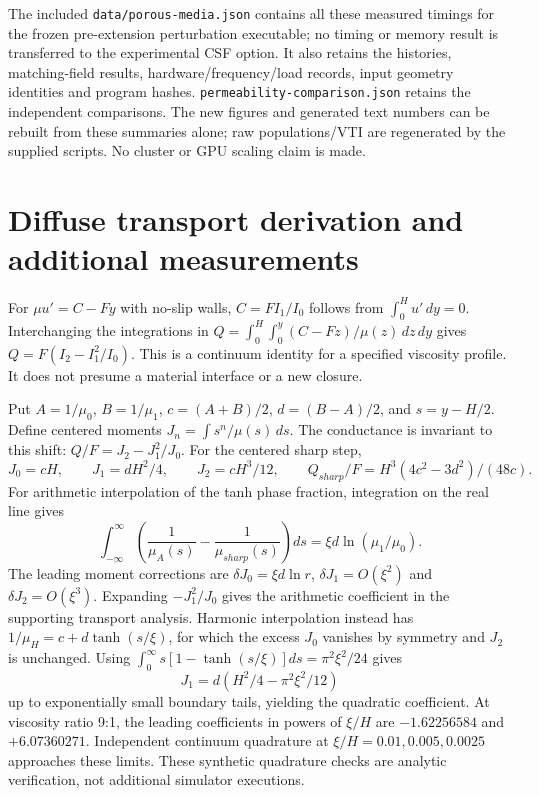 \documentclass[11pt]{article}
\begin{document}


The included \texttt{data/porous-media.json} contains all these measured
timings for the frozen pre-extension perturbation executable; no timing or
memory result is transferred to the experimental CSF option.
It also retains the
histories, matching-field results, hardware/frequency/load records, input
geometry identities and program hashes. \texttt{permeability-comparison.json}
retains the independent comparisons. The new figures and generated text
numbers can be rebuilt from these summaries alone; raw populations/VTI are
regenerated by the supplied scripts. No cluster or GPU scaling claim is made.

\section{Diffuse transport derivation and additional measurements}
For $\mu u'=C-Fy$ with no-slip walls, $C=FI_1/I_0$ follows from
$\int_0^H u'\,dy=0$. Interchanging the integrations in
$Q=\int_0^H\int_0^y(C-Fz)/\mu(z)\,dz\,dy$ gives
$Q=F(I_2-I_1^2/I_0)$. This is a continuum identity for a specified viscosity
profile. It does not presume a material interface or a new closure.

Put $A=1/\mu_0$, $B=1/\mu_1$, $c=(A+B)/2$, $d=(B-A)/2$,
and $s=y-H/2$. Define centered moments $J_n=\int s^n/\mu(s)\,ds$.
The conductance is invariant to this shift:
$Q/F=J_2-J_1^2/J_0$. For the centered sharp step,
\begin{equation}
 J_0=cH,\qquad J_1=dH^2/4,\qquad J_2=cH^3/12,\qquad
 Q_{sharp}/F=H^3(4c^2-3d^2)/(48c).
\end{equation}
For arithmetic interpolation of the tanh phase fraction, integration on the
real line gives
\begin{equation}
 \int_{-\infty}^{\infty}\left(\frac1{\mu_A(s)}-
 \frac1{\mu_{sharp}(s)}\right)ds=\xi d\ln(\mu_1/\mu_0).
\end{equation}
The leading moment corrections are
$\delta J_0=\xi d\ln r$, $\delta J_1=O(\xi^2)$ and
$\delta J_2=O(\xi^3)$. Expanding $-J_1^2/J_0$ gives the arithmetic
coefficient in the supporting transport analysis. Harmonic interpolation instead has
$1/\mu_H=c+d\tanh(s/\xi)$, for which the excess $J_0$ vanishes by symmetry
and $J_2$ is unchanged. Using
$\int_0^\infty s[1-\tanh(s/\xi)]ds=\pi^2\xi^2/24$ gives
\begin{equation}
 J_1=d\left(H^2/4-\pi^2\xi^2/12\right)
\end{equation}
up to exponentially small boundary tails, yielding the quadratic coefficient.
At viscosity ratio 9:1, the leading coefficients in powers of $\xi/H$ are
$-1.62256584$ and $+6.07360271$. Independent continuum quadrature at
$\xi/H=0.01,0.005,0.0025$ approaches these limits. These synthetic quadrature
checks are analytic verification, not additional simulator executions.
\end{document}
